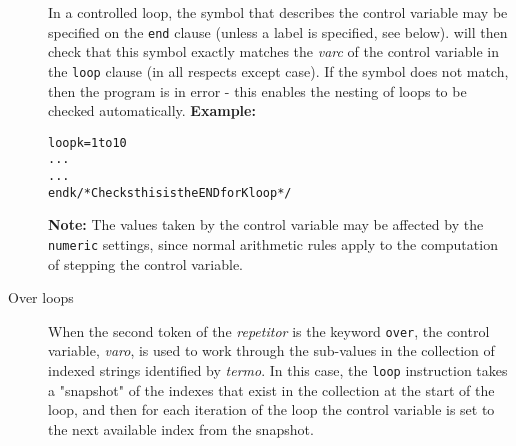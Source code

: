 \begin{description}
In a controlled loop, the symbol that describes the control variable may
be specified on the \texttt{end} clause (unless a label is specified,
see below).
\nr{} will then check that this symbol exactly matches the
\emph{varc} of the control variable in the \texttt{loop} clause (in
all respects except case).
If the symbol does not match, then the program is in error - this
enables the nesting of loops to be checked automatically.
 \textbf{Example:}
\begin{alltt}
loop k=1 to 10
  ...
  ...
  end k  /* Checks this is the END for K loop */
\end{alltt}
\textbf{Note: }The values taken by the control variable may be affected by the
\texttt{numeric} settings, since normal \nr{} arithmetic rules apply
to the computation of stepping the control variable.
\item[Over loops]\label{refloopov}

When the second token of the \emph{repetitor} is the keyword
\texttt{over}, the control variable, \emph{varo}, is used
to work through the sub-values in the collection of indexed strings
identified by \emph{termo}.
In this case, the \texttt{loop} instruction takes a "snapshot" of
the indexes that exist in the collection at the start of the loop, and
then for each iteration of the loop the control variable is set to the
next available index from the snapshot.
 

\end{description}
